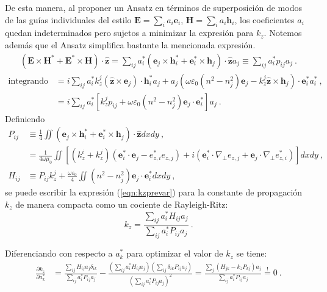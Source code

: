 De esta manera, al proponer un Ansatz en términos de superposición de modos de las guías individuales del estilo $\textbf{E} = \sum_i a_i \textbf{e}_i$, $\textbf{H} = \sum_i a_i \textbf{h}_i$, los coeficientes $a_i$ quedan indeterminados pero sujetos a minimizar la expresión para $k_z$. Notemos además que el Ansatz simplifica bastante la mencionada expresión.
\begin{align*}
	(\textbf{E}\times\textbf{H}^* + \textbf{E}^*\times\textbf{H})\cdot\hat{\textbf{z}} = \sum_{ij} a_i^*( \textbf{e}_j \times  \textbf{h}_i^* + \textbf{e}_i^* \times  \textbf{h}_j  )\cdot\hat{\textbf{z}} a_j \equiv \sum_{ij} a_i^* p_{ij} a_j \ .
\end{align*}
\begin{align*}
	\text{integrando numerador} &= i\sum_{ij} a_i^* k_z^j (\hat{\textbf{z}}\times\textbf{e}_j )\cdot\textbf{h}_i^* a_j + a_j\left(\omega \varepsilon_0 (n^2-n_j^2) \textbf{e}_j-k_z^j \hat{\textbf{z}}\times\textbf{h}_j \right)\cdot \textbf{e}_i^* a_i^* \ ,
	\\
	&= i\sum_{ij}  a_i^*\left[ k_z^j p_{ij}  +  \omega \varepsilon_0(n^2-n_j^2) \textbf{e}_j \cdot \textbf{e}_i^* \right] a_j \ .
\end{align*}
Definiendo 
\begin{align}
	P_{ij} &\equiv \frac{1}{4} \iint ( \textbf{e}_j \times  \textbf{h}_i^* + \textbf{e}_i^* \times  \textbf{h}_j  )\cdot\hat{\textbf{z}} dxdy \ , \label{eqn:pij-ori}
	\\
	&= \frac{1}{4 \omega \mu_0} \iint \left[ 
(k_z^i + k_z^j) \left( \textbf{e}_i^* \cdot \textbf{e}_j - e_{z,i}^* e_{z,j} \right) 
+ i \left( \textbf{e}_i^* \cdot \nabla_\perp e_{z,j} + \textbf{e}_j \cdot \nabla_\perp e_{z,i}^* \right) 
\right] dxdy \ ,	 \label{eqn:pij-simpli}
	\\
	H_{ij} &\equiv  P_{ij} k_z^j + \frac{\omega \varepsilon_0}{4} \iint(n^2-n_j^2) \textbf{e}_j \cdot \textbf{e}_i^* dxdy \ , \label{eqn:hij}
\end{align} 
se puede escribir la expresión (\ref{eqn:kzprevar}) para la constante de propagación $k_z$ de manera compacta como un cociente de Rayleigh-Ritz:
\begin{equation}
	k_z = \frac{\sum_{ij} a_i^* H_{ij} a_j}{\sum_{ij} a_i^*P_{ij} a_j} \ .
\end{equation}

Diferenciando con respecto a $a_k^*$ para optimizar el valor de $k_z$ se tiene:
\begin{align}
	\frac{\partial k_z}{\partial a_k^*} &= \frac{\sum_{ij} H_{ij} a_j \delta_{ik}}{\sum_{ij} a_i^*P_{ij} a_j} - \frac{\left(\sum_{ij} a_i^* H_{ij} a_j\right) \left( 
	\sum_{ij} \delta_{ik} P_{ij} a_j \right) }{\left(\sum_{ij} a_i^*P_{ij} a_j\right)^2} = \frac{\sum_{j} \left(H_{jk}  - k_z P_{kj} \right) a_j}{\sum_{ij} a_i^* P_{ij}a_j} \overset{!}{=} 0 \ .
\end{align}


